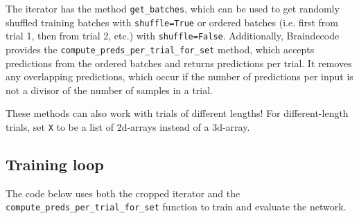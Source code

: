 \documentclass[11pt]{article}
\begin{document}
    The iterator has the method \texttt{get\_batches}, which can be used to
get randomly shuffled training batches with \texttt{shuffle=True} or
ordered batches (i.e. first from trial 1, then from trial 2, etc.) with
\texttt{shuffle=False}. Additionally, Braindecode provides the
\texttt{compute\_preds\_per\_trial\_for\_set} method, which accepts
predictions from the ordered batches and returns predictions per trial.
It removes any overlapping predictions, which occur if the number of
predictions per input is not a divisor of the number of samples in a
trial.

These methods can also work with trials of different lengths! For
different-length trials, set \texttt{X} to be a list of 2d-arrays
instead of a 3d-array.

    \subsection{Training loop}\label{training-loop}

    The code below uses both the cropped iterator and the
\texttt{compute\_preds\_per\_trial\_for\_set} function to train and
evaluate the network.
\end{document}
